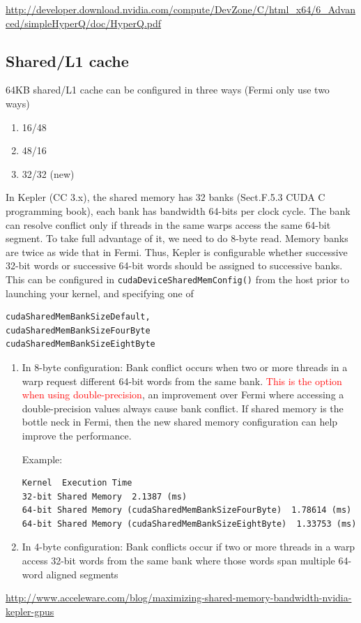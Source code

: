 \url{http://developer.download.nvidia.com/compute/DevZone/C/html_x64/6_Advanced/simpleHyperQ/doc/HyperQ.pdf}

\subsection{Shared/L1 cache}
\label{sec:Kepler_L1cache}

64KB shared/L1 cache can be configured in three ways (Fermi only use two ways)
\begin{enumerate}
  \item 16/48
  \item 48/16
  \item 32/32 (new)
\end{enumerate}

In Kepler (CC 3.x), the shared memory has 32 banks (Sect.F.5.3 CUDA C
programming book), each bank has bandwidth 64-bits per clock cycle. The bank can
resolve conflict only if threads in the same warps access the same 64-bit
segment. To take full advantage of it, we need to do 8-byte read.
Memory banks are twice as wide that in Fermi. Thus, Kepler is configurable
whether successive 32-bit words or successive 64-bit words should be assigned to
successive banks. This can be configured in \verb!cudaDeviceSharedMemConfig()!
from the host prior to launching your kernel, and specifying one of 
\begin{verbatim}
cudaSharedMemBankSizeDefault, 
cudaSharedMemBankSizeFourByte 
cudaSharedMemBankSizeEightByte
\end{verbatim}
\begin{enumerate}
  \item  In 8-byte configuration: Bank conflict occurs when two or more threads in a warp
request different 64-bit words from the same bank. \textcolor{red}{This is the
option when using double-precision}, an improvement over Fermi where
accessing a double-precision values always cause bank conflict. If shared memory
is the bottle neck in Fermi, then the new shared memory configuration can help
improve the performance.
  
Example:
\begin{verbatim}
Kernel  Execution Time
32-bit Shared Memory  2.1387 (ms)
64-bit Shared Memory (cudaSharedMemBankSizeFourByte)  1.78614 (ms)
64-bit Shared Memory (cudaSharedMemBankSizeEightByte)  1.33753 (ms)
\end{verbatim}  

  \item In 4-byte configuration: Bank conflicts occur if two or more threads in
  a warp access 32-bit words from the same bank where those words span multiple
  64-word aligned segments 
\end{enumerate}
\url{http://www.acceleware.com/blog/maximizing-shared-memory-bandwidth-nvidia-kepler-gpus}

